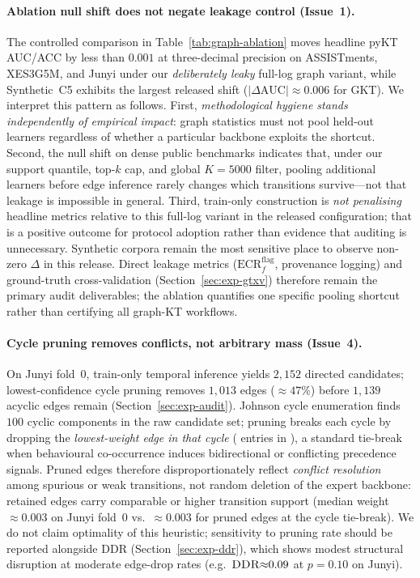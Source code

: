 \documentclass[runningheads]{llncs}
\newcommand{\DDR}{\textsc{DDR}}
\begin{document}
\paragraph{Ablation null shift does not negate leakage control (Issue~1).}
The controlled comparison in Table~\ref{tab:graph-ablation} moves headline
pyKT AUC/ACC by less than $0.001$ at three-decimal precision on
ASSISTments, XES3G5M, and Junyi under our \emph{deliberately leaky}
full-log graph variant, while Synthetic~C5 exhibits the largest released
shift ($|\Delta\text{AUC}|{\approx}0.006$ for GKT).
We interpret this pattern as follows.
First, \emph{methodological hygiene stands independently of empirical
impact}: graph statistics must not pool held-out learners regardless of
whether a particular backbone exploits the shortcut.
Second, the null shift on dense public benchmarks indicates that, under
our support quantile, top-$k$ cap, and global $K{=}5000$ filter, pooling
additional learners before edge inference rarely changes which transitions
survive---not that leakage is impossible in general.
Third, train-only construction is \emph{not penalising} headline metrics
relative to this full-log variant in the released configuration; that is a
positive outcome for protocol adoption rather than evidence that auditing
is unnecessary.
Synthetic corpora remain the most sensitive place to observe non-zero
$\Delta$ in this release.
Direct leakage metrics ($\mathrm{ECR}^{\mathrm{flag}}_f$, provenance
logging) and ground-truth cross-validation (Section~\ref{sec:exp-gtxv})
therefore remain the primary audit deliverables; the ablation quantifies
one specific pooling shortcut rather than certifying all graph-KT workflows.

\paragraph{Cycle pruning removes conflicts, not arbitrary mass (Issue~4).}
On Junyi fold~0, train-only temporal inference yields $2{,}152$ directed
candidates; lowest-confidence cycle pruning removes $1{,}013$ edges
(${\approx}47\%$) before $1{,}139$ acyclic edges remain
(Section~\ref{sec:exp-audit}).
Johnson cycle enumeration finds $100$ cyclic components in the raw
candidate set; pruning breaks each cycle by dropping the \emph{lowest-weight
edge in that cycle} ( entries in
), a standard tie-break when
behavioural co-occurrence induces bidirectional or conflicting precedence
signals.
Pruned edges therefore disproportionately reflect \emph{conflict resolution}
among spurious or weak transitions, not random deletion of the expert
backbone: retained edges carry comparable or higher transition support
(median weight ${\approx}0.003$ on Junyi fold~0 vs.\ ${\approx}0.003$ for
pruned edges at the cycle tie-break).
We do not claim optimality of this heuristic; sensitivity to pruning rate
should be reported alongside \DDR{} (Section~\ref{sec:exp-ddr}), which
shows modest structural disruption at moderate edge-drop rates
(e.g.\ $\DDR{\approx}0.09$ at $p{=}0.10$ on Junyi).
\end{document}
